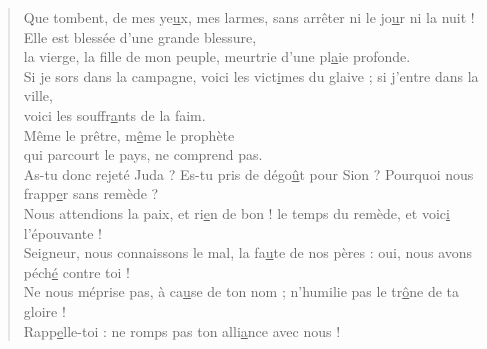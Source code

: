 \begin{verse}
Que tombent, de mes ye\underline{u}x, mes larmes,\psalmstar
sans arrêter ni le jo\underline{u}r ni la nuit !\\

Elle est blessée d'une grande blessure,\\
la vierge, la f\underline{i}lle de mon peuple, \psalmstar
meurtrie d'une pl\underline{a}ie profonde.\\

Si je sors dans la campagne,\psalmstar
voici les vict\underline{i}mes du glaive ; \psalmstar
si j'entre dans la ville, \\
voici les souffr\underline{a}nts de la faim.\\

Même le prêtre, m\underline{ê}me le prophète\\
qui parcourt le pays, ne comprend pas.\\

As-tu donc rejeté Juda ? \psalmdagger
Es-tu pris de dégo\underline{û}t pour Sion ? \psalmstar
Pourquoi nous frapp\underline{e}r sans remède ?\\

Nous attendions la paix, et ri\underline{e}n de bon ! \psalmstar
le temps du remède, et voic\underline{i} l'épouvante !\\

Seigneur, nous connaissons le mal,\psalmstar
la fa\underline{u}te de nos pères : \psalmstar
oui, nous avons péch\underline{é} contre toi !\\

Ne nous méprise pas,\psalmstar
à ca\underline{u}se de ton nom ; \psalmstar
n'humilie pas le tr\underline{ô}ne de ta gloire !\\

Rapp\underline{e}lle-toi : \psalmstar
ne romps pas ton alli\underline{a}nce avec nous !\\

\end{verse}

